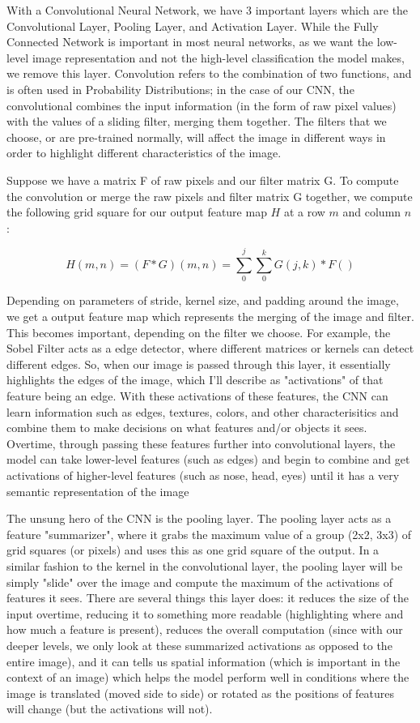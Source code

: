 \documentclass[10pt,twocolumn]{article}
\begin{document}
With a Convolutional Neural Network, we have 3 important layers which are the Convolutional Layer, Pooling Layer, and Activation Layer. While the Fully Connected Network is important in most neural networks, as we want the low-level image representation and not the high-level classification the model makes, we remove this layer. Convolution refers to the combination of two functions, and is often used in Probability Distributions; in the case of our CNN, the convolutional combines the input information (in the form of raw pixel values) with the values of a sliding filter, merging them together. The filters that we choose, or are pre-trained normally, will affect the image in different ways in order to highlight different characteristics of the image. 

Suppose we have a matrix F of raw pixels and our filter matrix G. To compute the convolution or merge the raw pixels and filter matrix G together, we compute the following grid square for our output feature map $H$ at a row $m$ and column $n$:

\[ H(m, n)  =  (F * G)(m, n) = \sum_{0}^{j} \sum_{0}^{k} G(j, k) * F() \]

Depending on parameters of stride, kernel size, and padding around the image, we get a output feature map which represents the merging of the image and filter. This becomes important, depending on the filter we choose. For example, the Sobel Filter \cite{} acts as a edge detector, where different matrices or kernels can detect different edges. So, when our image is passed through this layer, it essentially highlights the edges of the image, which I'll describe as "activations" of that feature being an edge. With these activations of these features, the CNN can learn information such as edges, textures, colors, and other characterisitics and combine them to make decisions on what features and/or objects it sees. Overtime, through passing these features further into convolutional layers, the model can take lower-level features (such as edges) and begin to combine and get activations of higher-level features (such as nose, head, eyes) until it has a very semantic representation of the image

The unsung hero of the CNN is the pooling layer. The pooling layer acts as a feature "summarizer", where it grabs the maximum value of a group (2x2, 3x3) of grid squares (or pixels) and uses this as one grid square of the output. In a similar fashion to the kernel in the convolutional layer, the pooling layer will be simply "slide" over the image and compute the maximum of the activations of features it sees. There are several things this layer does: it reduces the size of the input overtime, reducing it to something more readable (highlighting where and how much a feature is present), reduces the overall computation (since with our deeper levels, we only look at these summarized activations as opposed to the entire image), and it can tells us spatial information (which is important in the context of an image) which helps the model perform well in conditions where the image is translated (moved side to side) or rotated as the positions of features will change (but the activations will not).
\end{document}
